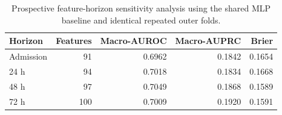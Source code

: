 \begin{table}[!t]
\centering
\caption{Prospective feature-horizon sensitivity analysis using the shared MLP baseline and identical repeated outer folds.}
\label{tab:temporal_r1}
\small
\begin{tabular}{lrrrr}
\toprule
Horizon & Features & Macro-AUROC & Macro-AUPRC & Brier \\
\midrule
Admission & 91 & 0.6962 & 0.1842 & 0.1654 \\
24 h & 94 & 0.7018 & 0.1834 & 0.1668 \\
48 h & 97 & 0.7049 & 0.1868 & 0.1589 \\
72 h & 100 & 0.7009 & 0.1920 & 0.1591 \\
\bottomrule
\end{tabular}
\end{table}
